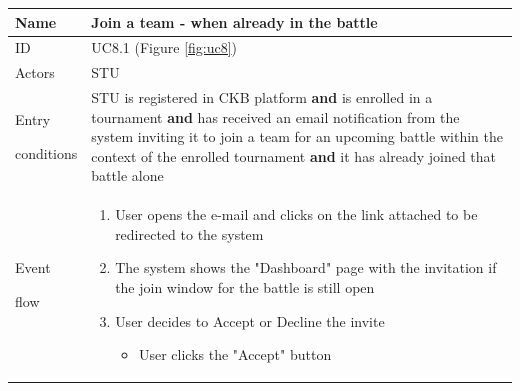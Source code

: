\begin{center}
    \def\arraystretch{1.5}
    \begin{tabular}{| m{2cm} | m{10cm}|}
        \hline
        Name                  & Join a team - when already in the battle                                                                                                                                                                                                                                                            \\ \hline
        ID                    & UC8.1 (Figure \ref{fig:uc8})                                                                                                                                                                                                                                                                        \\ \hline
        Actors                & STU                                                                                                                                                                                                                                                                                                 \\ \hline
        Entry \par conditions & STU is registered in CKB platform \textbf{and} is enrolled in a tournament \textbf{and} has received an email notification from the system inviting it to join a team for an upcoming battle within the context of the enrolled tournament \textbf{and} it has already joined that battle alone     \\ \hline
        Event \par flow       & \begin{enumerate}
                                    \item User opens the e-mail and clicks on the link attached to be redirected to the system
                                    \item The system shows the "Dashboard" page with the invitation if the join window for the battle is still open
                                    \item User decides to Accept or Decline the invite
                                    \begin{itemize}
                                        \item User clicks the "Accept" button
                                    \end{itemize}

\end{enumerate}
\end{tabular}
\end{center}
